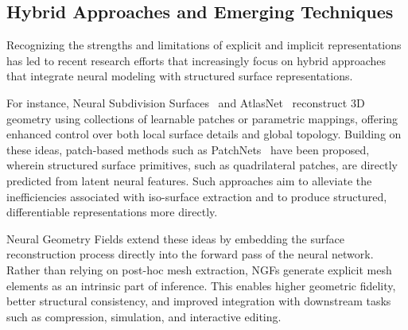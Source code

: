 \subsection{Hybrid Approaches and Emerging Techniques}
Recognizing the strengths and limitations of explicit and implicit representations has led to recent research efforts that increasingly focus on hybrid approaches that integrate neural modeling with structured surface representations.

For instance, Neural Subdivision Surfaces~\cite{oechsle2021neural} and AtlasNet~\cite{groueix2018atlasnet} reconstruct 3D geometry using collections of learnable patches or parametric mappings, offering enhanced control over both local surface details and global topology.
Building on these ideas, patch-based methods such as PatchNets~\cite{sivaram2024patchnets} have been proposed, wherein structured surface primitives, such as quadrilateral patches, are directly predicted from latent neural features.
Such approaches aim to alleviate the inefficiencies associated with iso-surface extraction and to produce structured, differentiable representations more directly.

Neural Geometry Fields extend these ideas by embedding the surface reconstruction process directly into the forward pass of the neural network.
Rather than relying on post-hoc mesh extraction, NGFs generate explicit mesh elements as an intrinsic part of inference.
This enables higher geometric fidelity, better structural consistency, and improved integration with downstream tasks such as compression, simulation, and interactive editing.